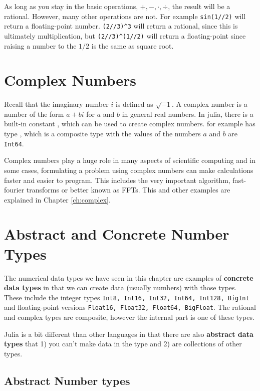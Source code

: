 As long as you stay in the basic operations, $+,-,\cdot, \div$, the result will be a rational. However, many other operations are not. For example \texttt{sin(1//2)} will return a floating-point number. \texttt{(2//3)\^{}3} will return a rational, since this is ultimately multiplication, but \texttt{(2//3)\^{}(1//2)} will return a floating-point since raising a number to the $1/2$ is the same as square root. 

\hypertarget{complex-numbers}{%
\section{Complex Numbers}\label{complex-numbers}}

Recall that the imaginary number $i$ is defined as $\sqrt{-1}$. A complex number is a number of the form $a+bi$ for $a$ and $b$ in general real numbers.  In julia, there is a built-in constant , which can be used to create complex numbers.  for example  has type \printpythontex[verb], which is a composite type with the values of the numbers $a$ and $b$ are \texttt{Int64}.  

Complex numbers play a huge role in many aspects of scientific computing and in some cases, formulating a problem using complex numbers can make calculations faster and easier to program.  This includes the very important algorithm, fast-fourier transforms or better known as FFTs.  This and other examples are explained in  Chapter \ref{ch:complex}. 


\section{Abstract and Concrete Number Types} \label{sect:abstract:type}


The numerical data types we have seen in this chapter are examples of \textbf{concrete data types} in that we can create data (usually numbers) with those types.  These include the integer types \verb!Int8, Int16, Int32, Int64, Int128, BigInt! and floating-point versions \verb!Float16, Float32, Float64, BigFloat!.  The rational and complex types are composite, however the internal part is one of these types.  

Julia is a bit different than other languages in that there are also \textbf{abstract data types} that 1) you can't make data in the type and 2) are collections of other types.  


\subsection{Abstract Number types}

